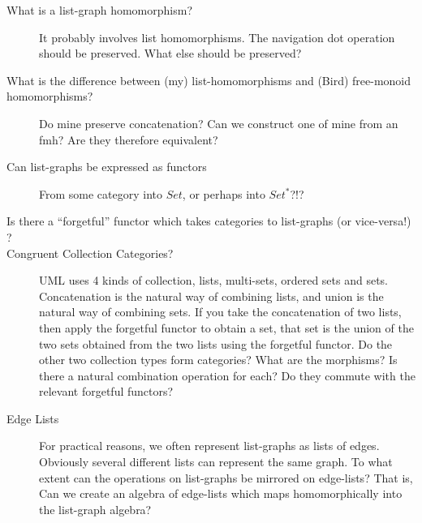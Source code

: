 \documentclass[a4paper]{article}
\begin{document}
\begin{description}
\item[What is a list-graph homomorphism?]  It probably involves list
  homomorphisms.  The navigation dot operation should be preserved.
  What else should be preserved?
\item[What is the difference between (my) list-homomorphisms and
  (Bird) free-monoid homomorphisms?]  Do mine preserve concatenation?
  Can we construct one of mine from an fmh?  Are they therefore
  equivalent?
\item[Can list-graphs be expressed as functors] From some category
  into $Set$, or perhaps into $Set^*$?!?
\item[Is there a ``forgetful'' functor which takes categories to list-graphs (or vice-versa!) ?]
\item[Congruent Collection Categories?] UML uses 4 kinds of
  collection, lists, multi-sets, ordered sets and sets.  Concatenation
  is the natural way of combining lists, and union is the natural way
  of combining sets.  If you take the concatenation of two lists, then
  apply the forgetful functor to obtain a set, that set is the union
  of the two sets obtained from the two lists using the forgetful
  functor.  Do the other two collection types form categories?  What
  are the morphisms?  Is there a natural combination operation for
  each?  Do they commute with the relevant forgetful functors?
\item[Edge Lists] For practical reasons, we often represent
  list-graphs as lists of edges.  Obviously several different lists
  can represent the same graph.  To what extent can the operations on
  list-graphs be mirrored on edge-lists?  That is, Can we create an
  algebra of edge-lists which maps homomorphically into the list-graph
  algebra?
\end{description}


 

\end{document}
